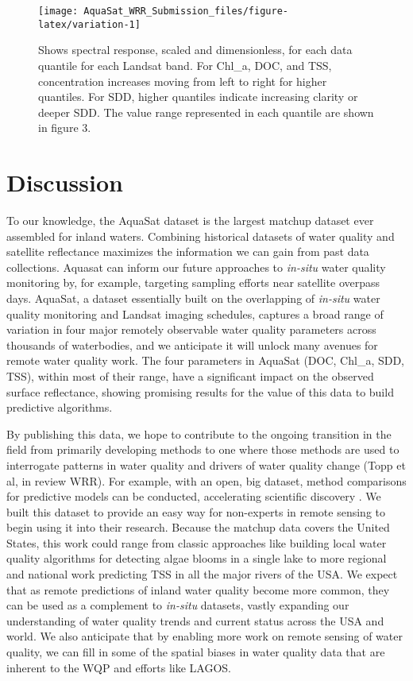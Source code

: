 \documentclass[draft,linenumbers]{agujournal2018}
\begin{document}
\begin{figure}[h]
\texttt{[image: AquaSat\_WRR\_Submission\_files/figure-latex/variation-1]} \caption{Shows spectral response, scaled and dimensionless, for each data quantile for each Landsat band. For Chl\_a, DOC, and TSS, concentration increases moving from left to right for higher quantiles. For SDD, higher quantiles indicate increasing clarity or deeper SDD. The value range represented in each quantile are shown in figure 3.}\label{fig:variation}
\end{figure}

\section{Discussion}

To our knowledge, the AquaSat dataset is the largest matchup dataset
ever assembled for inland waters. Combining historical datasets of water
quality and satellite reflectance maximizes the information we can gain
from past data collections. Aquasat can inform our future approaches to
\emph{in-situ} water quality monitoring by, for example, targeting
sampling efforts near satellite overpass days. AquaSat, a dataset
essentially built on the overlapping of \emph{in-situ} water quality
monitoring and Landsat imaging schedules, captures a broad range of
variation in four major remotely observable water quality parameters
across thousands of waterbodies, and we anticipate it will unlock many
avenues for remote water quality work. The four parameters in AquaSat
(DOC, Chl\_a, SDD, TSS), within most of their range, have a significant
impact on the observed surface reflectance, showing promising results
for the value of this data to build predictive algorithms.

By publishing this data, we hope to contribute to the ongoing transition
in the field from primarily developing methods to one where those
methods are used to interrogate patterns in water quality and drivers of
water quality change (Topp et al, in review WRR). For example, with an
open, big dataset, method comparisons for predictive models can be
conducted, accelerating scientific discovery \citep{Bukata2013}. We
built this dataset to provide an easy way for non-experts in remote
sensing to begin using it into their research. Because the matchup data
covers the United States, this work could range from classic approaches
like building local water quality algorithms for detecting algae blooms
in a single lake to more regional and national work predicting TSS in
all the major rivers of the USA. We expect that as remote predictions of
inland water quality become more common, they can be used as a
complement to \emph{in-situ} datasets, vastly expanding our
understanding of water quality trends and current status across the USA
and world. We also anticipate that by enabling more work on remote
sensing of water quality, we can fill in some of the spatial biases in
water quality data that are inherent to the WQP and efforts like LAGOS.
\end{document}

